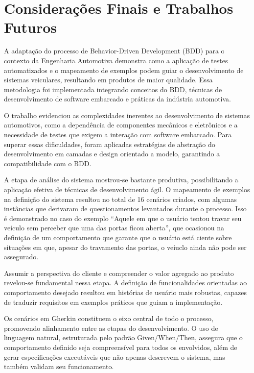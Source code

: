 \chapter{Considerações Finais e Trabalhos Futuros}
\label{ch:CC}
 
A adaptação do processo de Behavior-Driven Development (BDD) para o contexto da Engenharia Automotiva demonstra como a aplicação de testes automatizados e o 
mapeamento de exemplos podem guiar o desenvolvimento de sistemas veiculares, resultando em produtos de maior qualidade. Essa metodologia foi implementada integrando 
conceitos do BDD, técnicas de desenvolvimento de software embarcado e práticas da indústria automotiva.

O trabalho evidenciou as complexidades inerentes ao desenvolvimento de sistemas automotivos, como a dependência de componentes mecânicos e eletrônicos e a necessidade 
de testes que exigem a interação com software embarcado. Para superar essas dificuldades, foram aplicadas estratégias de abstração do desenvolvimento em camadas 
e design orientado a modelo, garantindo a compatibilidade com o BDD.

A etapa de análise do sistema mostrou-se bastante produtiva, possibilitando a aplicação efetiva de técnicas de desenvolvimento ágil. O mapeamento de exemplos 
na definição do sistema resultou no total de 16 cenários criados, com algumas instâncias que derivaram de questionamentos levantados durante o processo. Isso 
é demonstrado no caso do exemplo ``Aquele em que o usuário tentou travar seu veículo sem perceber que uma das portas ficou aberta'', que ocasionou na definição 
de um comportamento que garante que o usuário está ciente sobre situações em que, apesar do travamento das portas, o veíuclo ainda não pode ser assegurado.

Assumir a perspectiva do cliente e compreender o valor agregado ao produto revelou-se fundamental nessa etapa. A definição de funcionalidades orientadas ao 
comportamento desejado resultou em histórias de usuário mais robustas, capazes de traduzir requisitos em exemplos práticos que guiam a implementação.

Os cenários em Gherkin constituem o eixo central de todo o processo, promovendo alinhamento entre as etapas do desenvolvimento. O uso de linguagem natural, estruturada 
pelo padrão Given/When/Then, assegura que o comportamento definido seja compreensível para todos os envolvidos, além de gerar especificações executáveis que não 
apenas descrevem o sistema, mas também validam seu funcionamento.


